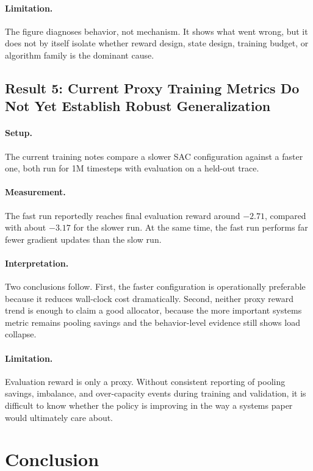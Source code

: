 \documentclass[11pt]{article}
\theoremstyle{definition}
\begin{document}
\paragraph{Limitation.}
The figure diagnoses behavior, not mechanism. It shows what went wrong, but it
does not by itself isolate whether reward design, state design, training budget,
or algorithm family is the dominant cause.

\subsection{Result 5: Current Proxy Training Metrics Do Not Yet Establish Robust Generalization}

\paragraph{Setup.}
The current training notes compare a slower SAC configuration against a faster
one, both run for 1M timesteps with evaluation on a held-out trace.

\paragraph{Measurement.}
The fast run reportedly reaches final evaluation reward around $-2.71$, compared
with about $-3.17$ for the slower run. At the same time, the fast run performs
far fewer gradient updates than the slow run.

\paragraph{Interpretation.}
Two conclusions follow. First, the faster configuration is operationally
preferable because it reduces wall-clock cost dramatically. Second, neither proxy
reward trend is enough to claim a good allocator, because the more important
systems metric remains pooling savings and the behavior-level evidence still shows
load collapse.

\paragraph{Limitation.}
Evaluation reward is only a proxy. Without consistent reporting of pooling
savings, imbalance, and over-capacity events during training and validation, it
is difficult to know whether the policy is improving in the way a systems paper
would ultimately care about.

\section{Conclusion}
\end{document}
